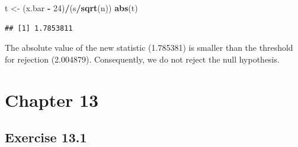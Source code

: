 \documentclass[]{krantz}
\makeatletter
\newenvironment{Shaded}{\begin{snugshade}}{\end{snugshade}}
\newcommand{\DecValTok}[1]{\textcolor[rgb]{0.00,0.00,0.81}{#1}}
\newcommand{\KeywordTok}[1]{\textcolor[rgb]{0.13,0.29,0.53}{\textbf{#1}}}
\newcommand{\NormalTok}[1]{#1}
\newcommand{\OperatorTok}[1]{\textcolor[rgb]{0.81,0.36,0.00}{\textbf{#1}}}
\newcommand{\StringTok}[1]{\textcolor[rgb]{0.31,0.60,0.02}{#1}}
\newenvironment{kframe}{%
\medskip{}
\setlength{\fboxsep}{.8em}
 \def\at@end@of@kframe{}%
 \ifinner\ifhmode%
  \def\at@end@of@kframe{\end{minipage}}%
  \begin{minipage}{\columnwidth}%
 \fi\fi%
 \def\FrameCommand##1{\hskip\@totalleftmargin \hskip-\fboxsep
 \colorbox{shadecolor}{##1}\hskip-\fboxsep
     \hskip-\linewidth \hskip-\@totalleftmargin \hskip\columnwidth}%
 \MakeFramed {\advance\hsize-\width
   \@totalleftmargin\z@ \linewidth\hsize
   \@setminipage}}%
 {\par\unskip\endMakeFramed%
 \at@end@of@kframe}
\renewenvironment{Shaded}{\begin{kframe}}{\end{kframe}}
\theoremstyle{definition}
\theoremstyle{definition}
\theoremstyle{definition}
\theoremstyle{remark}
\makeatother
\begin{document}
\begin{enumerate}
\begin{Shaded}
\begin{Highlighting}[]
\NormalTok{t <-}\StringTok{ }\NormalTok{(x.bar }\OperatorTok{-}\StringTok{ }\DecValTok{24}\NormalTok{)}\OperatorTok{/}\NormalTok{(s}\OperatorTok{/}\KeywordTok{sqrt}\NormalTok{(n))}
\KeywordTok{abs}\NormalTok{(t)}
\end{Highlighting}
\end{Shaded}

\begin{verbatim}
## [1] 1.7853811
\end{verbatim}

  The absolute value of the new statistic (1.785381) is smaller than the
  threshold for rejection (2.004879). Consequently, we do not reject the
  null hypothesis.
\end{enumerate}

\hypertarget{chapter-13}{%
\section*{Chapter 13}\label{chapter-13}}


\hypertarget{exercise-13.1}{%
\subsection*{Exercise 13.1}\label{exercise-13.1}}
\end{document}
